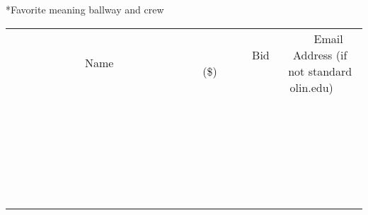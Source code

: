 \documentclass[11pt]{article}
\begin{document}
*Favorite meaning ballway and crew
\\[6ex]
\begin{tabular}{c c c}
~~~~~~~~~~~~~Name~~~~~~~~~~~~~ & ~~~~~~~~~Bid (\$)~~~~~~~~~  & ~~~Email Address (if not standard olin.edu)~~~\\
 & & \\
\hline
 & & \\
\hline
 & & \\
\hline
 & & \\
\hline
 & & \\
\hline
 & & \\
\hline
 & & \\
\hline
 & & \\
\hline
 & & \\
\hline
 & & \\
\hline
 & & \\
\hline
 & & \\
\hline
 & & \\
\hline
 & & \\
\hline
 & & \\
\hline
 & & \\
\hline
 & & \\
\hline
 & & \\
\hline
 & & \\
\hline
 & & \\
\hline
 & & \\
\hline
 & & \\
\hline
 & & \\
\hline
 & & \\
\hline
 & & \\
\hline
 & & \\
\hline
\end{tabular}
\newpage
\end{document}
